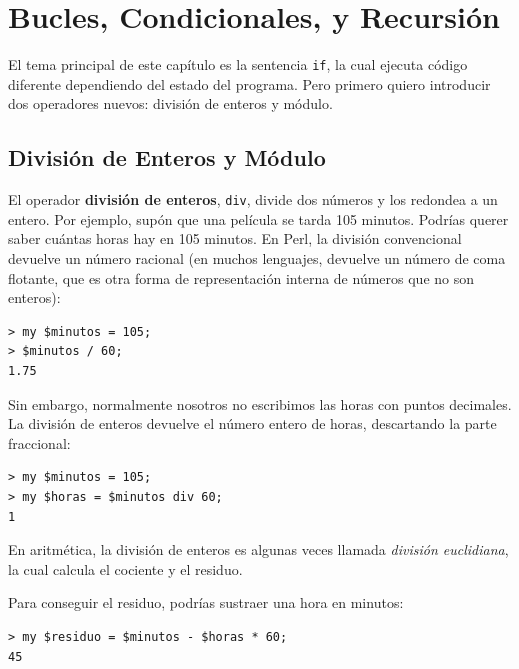\chapter{Bucles, Condicionales, y Recursión}
\label{conditionals}

El tema principal de  este capítulo es la sentencia {\tt if},
la cual ejecuta código diferente dependiendo del estado
del programa. Pero primero quiero introducir dos operadores
nuevos: división de enteros y módulo.


\section{División de Enteros y Módulo}

El operador {\bf división de enteros}, \verb"div", 
divide dos números y los redondea a un entero. Por ejemplo,
supón que una película se tarda 105 minutos. Podrías querer
saber cuántas horas hay en 105 minutos. En Perl, la división
convencional devuelve un número racional (en muchos lenguajes,
devuelve un número de coma flotante, que es otra forma
de representación interna de números que no son enteros):

\begin{verbatim}
> my $minutos = 105;
> $minutos / 60;
1.75
\end{verbatim}

Sin embargo, normalmente nosotros no escribimos las horas con
puntos decimales. La división de enteros devuelve el número
entero de horas, descartando la parte fraccional:

\begin{verbatim}
> my $minutos = 105;
> my $horas = $minutos div 60;
1
\end{verbatim}

En aritmética, la división de enteros es algunas veces
llamada \emph{división euclidiana}, la cual calcula el
cociente y el residuo.

Para conseguir el residuo, podrías sustraer una hora en 
minutos:

\begin{verbatim}
> my $residuo = $minutos - $horas * 60;
45
\end{verbatim}



